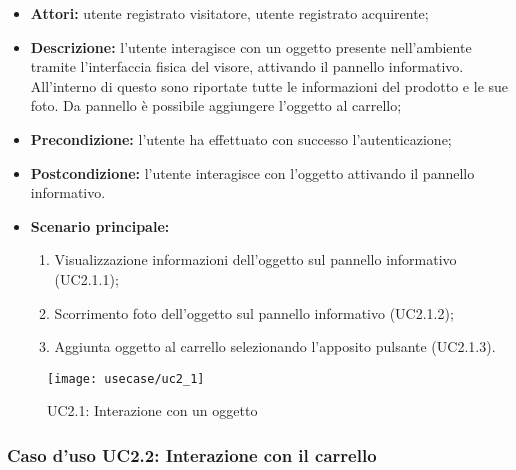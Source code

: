 \begin{itemize}
	\item \textbf{Attori:} utente registrato visitatore, utente registrato acquirente;
	\item \textbf{Descrizione:} l'utente interagisce con un oggetto presente nell'ambiente tramite l'interfaccia fisica del visore, attivando il pannello informativo. All'interno di questo sono riportate tutte le informazioni del prodotto e le sue foto. Da pannello è possibile aggiungere l'oggetto al carrello;
	\item \textbf{Precondizione:} l'utente ha effettuato con successo l'autenticazione;
	\item \textbf{Postcondizione:} l'utente interagisce con l'oggetto attivando il pannello informativo.
	\item \textbf{Scenario principale:}
	\begin{enumerate}
		\item Visualizzazione informazioni dell'oggetto sul pannello informativo (UC2.1.1);
		\item Scorrimento foto dell'oggetto sul pannello informativo (UC2.1.2);
		\item Aggiunta oggetto al carrello selezionando l'apposito pulsante (UC2.1.3).
	\end{enumerate}
\end{itemize}

\label{UC2.1}
\begin{figure}[ht]
	\begin{center}
		\texttt{[image: usecase/uc2\_1]}
		\caption{UC2.1: Interazione con un oggetto}
	\end{center}
\end{figure}
\FloatBarrier

\subsubsection{Caso d'uso UC2.2: Interazione con il carrello}


